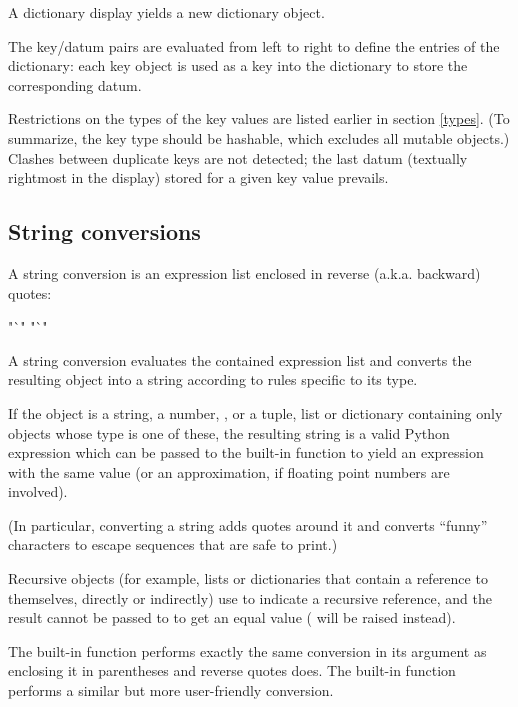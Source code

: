 A dictionary display yields a new dictionary object.

The key/datum pairs are evaluated from left to right to define the
entries of the dictionary: each key object is used as a key into the
dictionary to store the corresponding datum.

Restrictions on the types of the key values are listed earlier in
section \ref{types}.  (To summarize, the key type should be hashable,
which excludes all mutable objects.)  Clashes between duplicate keys
are not detected; the last datum (textually rightmost in the display)
stored for a given key value prevails.


\subsection{String conversions\label{string-conversions}}

A string conversion is an expression list enclosed in reverse (a.k.a.
backward) quotes:

\begin{productionlist}
             {"`"  "`"}
\end{productionlist}

A string conversion evaluates the contained expression list and
converts the resulting object into a string according to rules
specific to its type.

If the object is a string, a number, , or a tuple, list or
dictionary containing only objects whose type is one of these, the
resulting string is a valid Python expression which can be passed to
the built-in function  to yield an expression with the
same value (or an approximation, if floating point numbers are
involved).

(In particular, converting a string adds quotes around it and converts
``funny'' characters to escape sequences that are safe to print.)

Recursive objects (for example, lists or dictionaries that contain a
reference to themselves, directly or indirectly) use  to
indicate a recursive reference, and the result cannot be passed to
 to get an equal value ( will
be raised instead).

The built-in function  performs exactly the same
conversion in its argument as enclosing it in parentheses and reverse
quotes does.  The built-in function  performs a
similar but more user-friendly conversion.


